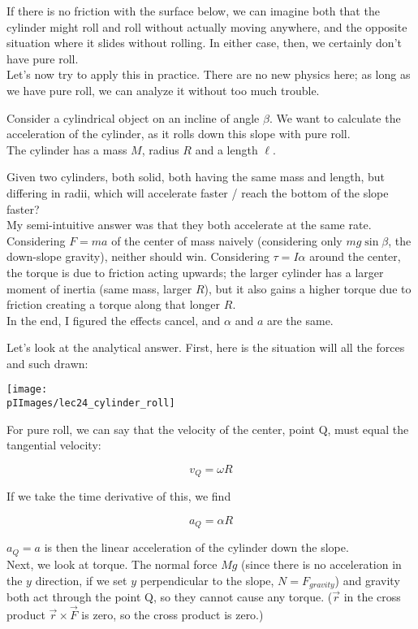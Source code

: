 If there is no friction with the surface below, we can imagine both that the cylinder might roll and roll without actually moving anywhere, and the opposite situation where it slides without rolling. In either case, then, we certainly don't have pure roll.\\
Let's now try to apply this in practice. There are no new physics here; as long as we have pure roll, we can analyze it without too much trouble.

Consider a cylindrical object on an incline of angle $\beta$. We want to calculate the acceleration of the cylinder, as it rolls down this slope with pure roll.\\
The cylinder has a mass $M$, radius $R$ and a length $\ell$.

Given two cylinders, both solid, both having the same mass and length, but differing in radii, which will accelerate faster / reach the bottom of the slope faster?\\
My semi-intuitive answer was that they both accelerate at the same rate. Considering $F = ma$ of the center of mass naively (considering only $m g \sin \beta$, the down-slope gravity), neither should win. Considering $\tau = I \alpha$ around the center, the torque is due to friction acting upwards; the larger cylinder has a larger moment of inertia (same mass, larger $R$), but it also gains a higher torque due to friction creating a torque along that longer $R$.\\
In the end, I figured the effects cancel, and $\alpha$ and $a$ are the same.

Let's look at the analytical answer. First, here is the situation will all the forces and such drawn:

\begin{center}
\texttt{[image: \\pIImages/lec24\_cylinder\_roll]}
\end{center}

For pure roll, we can say that the velocity of the center, point Q, must equal the tangential velocity:

\begin{equation}
v_Q = \omega R
\end{equation}

If we take the time derivative of this, we find

\begin{equation}
a_Q = \alpha R
\end{equation}

$a_Q = a$ is then the linear acceleration of the cylinder down the slope.\\
Next, we look at torque. The normal force $M g$ (since there is no acceleration in the $y$ direction, if we set $y$ perpendicular to the slope, $N = F_{gravity}$) and gravity both act through the point Q, so they cannot cause any torque. ($\vec{r}$ in the cross product $\vec{r} \times \vec{F}$ is zero, so the cross product is zero.)

